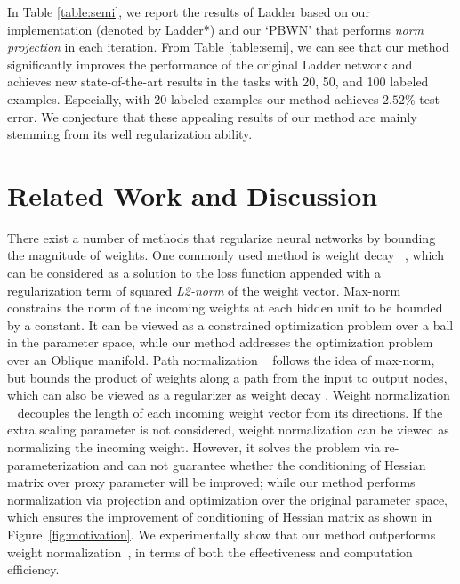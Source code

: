 \documentclass[twocolumn]{article}
\begin{document}
In Table \ref{table:semi}, we report the results of Ladder based on our implementation (denoted by Ladder*) and our `PBWN' that performs \emph{norm projection} in each iteration.
 From Table \ref{table:semi}, we can see that our method significantly improves the performance of the original Ladder network and achieves new state-of-the-art results in the tasks with 20, 50, and 100 labeled examples. Especially, with 20 labeled examples our method achieves $2.52\%$ test error. We conjecture that these appealing results of our method are mainly stemming from its well regularization ability. %

\section{Related Work and Discussion}
There exist a number of methods that regularize neural networks by bounding the magnitude of weights. One commonly used method is weight decay ~\cite{1992_WD_Krogh}, which can be considered as a solution to the loss function  appended with a regularization term of squared \emph{L2-norm }of the weight vector.
Max-norm ~\cite{2005_Nathan_2005,2014_JMLR_Nitish} constrains the norm of the incoming weights at each hidden unit to be bounded by a constant. It can be viewed as a constrained optimization problem over a ball in the parameter space, while our method addresses the optimization problem over an Oblique manifold. Path normalization ~\cite{2015_NIPS_Neyshabur} follows the idea of max-norm, but bounds the product of weights along a path from the input to output nodes, which can also be viewed as a regularizer as weight decay \cite{1992_WD_Krogh}. Weight normalization ~\cite{2016_CoRR_Salimans} decouples the length of each incoming weight vector from its directions. If the extra scaling parameter is not considered, weight normalization  can  be viewed as normalizing the incoming weight. However, it solves the problem via re-parameterization and can not guarantee whether the conditioning of Hessian matrix over proxy parameter will be improved; while our method performs normalization via projection and optimization over the original parameter space, which ensures the improvement of conditioning of Hessian matrix as shown in Figure~\ref{fig:motivation}. We experimentally show that our method outperforms weight normalization~\cite{2016_CoRR_Salimans}, in terms of both the effectiveness and computation efficiency.
\end{document}
